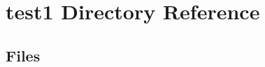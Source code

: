 \section{test1 Directory Reference}
\label{dir_13bf8d714d14c32ee50a8846264d07f3}
\subsection*{Files}
\begin{DoxyCompactItemize}
\end{DoxyCompactItemize}
